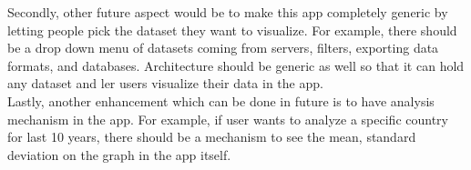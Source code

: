 Secondly, other future aspect would be to make this app completely generic by letting people pick the dataset they want to visualize. For example, there should be a drop down menu of datasets coming from servers, filters, exporting data formats, and databases. Architecture should be generic as well so that it can hold any dataset and ler users visualize their data in the app. \\

Lastly, another enhancement which can be done in future is to have analysis mechanism in the app. For example, if user wants to analyze a specific country for last 10 years, there should be a mechanism to see the mean, standard deviation on the graph in the app itself. 

